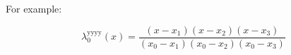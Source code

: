  

For example:

\begin{equation}
\lambda^{\text{yyyy}}_0(x) = 
\frac {(x - x_1) (x - x_2) (x - x_3)} 
{(x_0 - x_1) (x_0 - x_2) (x_0 - x_3)}
\end{equation}

% 
% 
% 
% 
 
